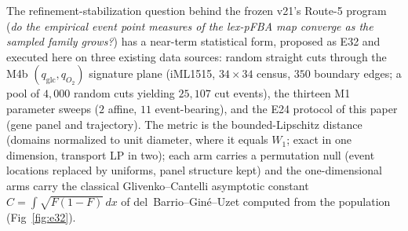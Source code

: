 \documentclass[11pt,a4paper]{article}
\theoremstyle{plain}
\theoremstyle{definition}
\theoremstyle{remark}
\begin{document}
The refinement-stabilization question behind the frozen v21's
Route-5 program (\emph{do the empirical event point measures of the
lex-pFBA map converge as the sampled family grows?}) has a
near-term statistical form, proposed as E32 and executed here on
three existing data sources: random straight cuts through the M4b
$(q_{\mathrm{glc}}, q_{O_2})$ signature plane (iML1515, $34\times34$
census, $350$ boundary edges; a pool of $4{,}000$ random cuts
yielding $25{,}107$ cut events), the thirteen M1 parameter sweeps
($2$ affine, $11$ event-bearing), and the E24 protocol of this paper
(gene panel and trajectory). The metric is the bounded-Lipschitz
distance (domains normalized to unit diameter, where it equals
$W_1$; exact in one dimension, transport LP in two); each arm carries
a permutation null (event locations replaced by uniforms, panel
structure kept) and the one-dimensional arms carry the classical
Glivenko--Cantelli asymptotic constant
$C = \int\sqrt{F(1-F)}\,dx$ of del~Barrio--Gin\'e--Uzet computed from
the population (Fig~\ref{fig:e32}).
\end{document}
